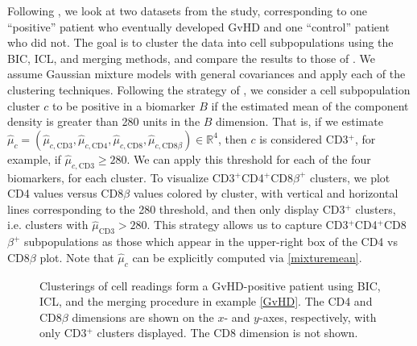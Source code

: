 \documentclass{uwstat572}
\newcommand*\reals{\mathbb{R}}
\newcommand*\estim[1]{\widehat{#1}}
\renewcommand\;{\,}
\begin{document}
Following \cite{Baudry10}, we look at two datasets from the study, corresponding to one ``positive'' patient who eventually developed GvHD and one ``control'' patient who did not.
The goal is to cluster the data into cell subpopulations using the BIC, ICL, and merging methods, and compare the results to those of \cite{Brinkman07}.
We assume Gaussian mixture models with general covariances and apply each of the clustering techniques.
Following the strategy of \cite{Lo08}, we consider a cell subpopulation cluster $c$ to be positive in a biomarker $B$ if the estimated mean of the component density is greater than 280 units in the $B$ dimension.
That is, if we estimate $\estim\mu_c = \left(\estim \mu_{c, \text{CD3}}, \estim \mu_{c, \text{CD4}}, \estim\mu_{c, \text{CD8}}, \estim\mu_{c, \text{CD8$\beta$}}\right) \in \reals^4$, then $c$ is considered CD3$^+$, for example, if $\estim\mu_{c, \text{CD3}} \ge 280$.
We can apply this threshold for each of the four biomarkers, for each cluster.
To visualize CD3$^+$CD4$^+$CD8$\beta^+$ clusters, we plot CD4 values versus CD8$\beta$ values colored by cluster, with vertical and horizontal lines corresponding to the 280 threshold, and then only display CD3$^+$ clusters, i.e. clusters with $\estim\mu_{\text{CD3}} > 280$.
This strategy allows us to capture CD3$^+$CD4$^+$CD8$\beta^+$ subpopulations as those which appear in the upper-right box of the CD4 vs CD8$\beta$ plot.
Note that $\estim\mu_c$ can be explicitly computed via \eqref{mixturemean}.

\begin{figure}
\begin{center}
\end{center}
\caption{Clusterings of cell readings form a GvHD-positive patient using BIC, ICL, and the merging procedure in example \ref{GvHD}. The CD4 and CD8$\beta$ dimensions are shown on the $x$- and $y$-axes, respectively, with only CD3$^+$ clusters displayed. The CD8 dimension is not shown.}
\label{positive}
\end{figure}
\end{document}
